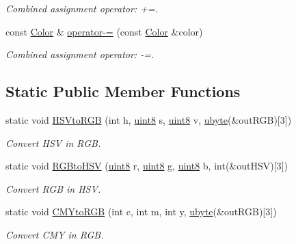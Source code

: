 \begin{DoxyCompactItemize}
\begin{DoxyCompactList}\small\item\em Combined assignment operator: +=. \item\end{DoxyCompactList}\item 
\hypertarget{class_f2_c_1_1_color_a80a25561d7980618700ad9ba9dbee578}{
const \hyperlink{class_f2_c_1_1_color}{Color} \& \hyperlink{class_f2_c_1_1_color_a80a25561d7980618700ad9ba9dbee578}{operator-\/=} (const \hyperlink{class_f2_c_1_1_color}{Color} \&color)}
\label{class_f2_c_1_1_color_a80a25561d7980618700ad9ba9dbee578}

\begin{DoxyCompactList}\small\item\em Combined assignment operator: -\/=. \item\end{DoxyCompactList}\end{DoxyCompactItemize}
\subsection*{Static Public Member Functions}
\begin{DoxyCompactItemize}
\item 
static void \hyperlink{class_f2_c_1_1_color_ab0188ae140cb5fe9c4279144590c8ec8}{HSVtoRGB} (int h, \hyperlink{namespace_f2_c_a711deb33697d145669b9c0c4fe87c7ca}{uint8} s, \hyperlink{namespace_f2_c_a711deb33697d145669b9c0c4fe87c7ca}{uint8} v, \hyperlink{namespace_f2_c_a74fad364688add30796d711e5635ac77}{ubyte}(\&outRGB)\mbox{[}3\mbox{]})
\begin{DoxyCompactList}\small\item\em Convert HSV in RGB. \item\end{DoxyCompactList}\item 
static void \hyperlink{class_f2_c_1_1_color_a3e133155389e2797f3bce82c5edf8345}{RGBtoHSV} (\hyperlink{namespace_f2_c_a711deb33697d145669b9c0c4fe87c7ca}{uint8} r, \hyperlink{namespace_f2_c_a711deb33697d145669b9c0c4fe87c7ca}{uint8} g, \hyperlink{namespace_f2_c_a711deb33697d145669b9c0c4fe87c7ca}{uint8} b, int(\&outHSV)\mbox{[}3\mbox{]})
\begin{DoxyCompactList}\small\item\em Convert RGB in HSV. \item\end{DoxyCompactList}\item 
static void \hyperlink{class_f2_c_1_1_color_a341fb0d5aace06580016fd4a3070df5c}{CMYtoRGB} (int c, int m, int y, \hyperlink{namespace_f2_c_a74fad364688add30796d711e5635ac77}{ubyte}(\&outRGB)\mbox{[}3\mbox{]})
\begin{DoxyCompactList}\small\item\em Convert CMY in RGB. \item\end{DoxyCompactList}\end{DoxyCompactItemize}
